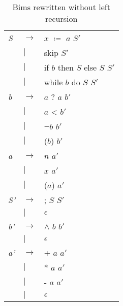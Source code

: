 


\begin{table}[htb!]
  \centering
  \begin{tabular}{ll>{\arraybackslash}p{10cm}}
    \textit{S}  & $\to$  & $x$ $\coloneqq$ $a$ $S'$      \\
                & $\mid$ & skip $S'$                     \\
                & $\mid$ & if $b$ then $S$ else $S$ $S'$ \\
                & $\mid$ & while $b$ do $S$ $S'$         \\
    \textit{b}  & $\to$  & $a$ ? $a$ $b'$                \\
                & $\mid$ & $a$ < $b'$                    \\
                & $\mid$ & $\neg$$b$ $b'$                \\
                & $\mid$ & ($b$) $b'$                    \\
    \textit{a}  & $\to$  & $n$ $a'$                      \\
                & $\mid$ & $x$ $a'$                      \\
                & $\mid$ & ($a$) $a'$                    \\
    \textit{S'} & $\to$  & ; $S$ $S'$                    \\
                & $\mid$ & $\epsilon$                    \\
    \textit{b'} & $\to$  & $\land$ $b$ $b'$              \\
                & $\mid$ & $\epsilon$                    \\
    \textit{a'} & $\to$  & + $a$ $a'$                    \\
                & $\mid$ & * $a$ $a'$                    \\
                & $\mid$ & - $a$ $a'$                    \\
                & $\mid$ & $\epsilon$                    \\
  \end{tabular}
  \caption{Bims rewritten without left recursion}
  \label{tab:bimsrewrite}
\end{table}


